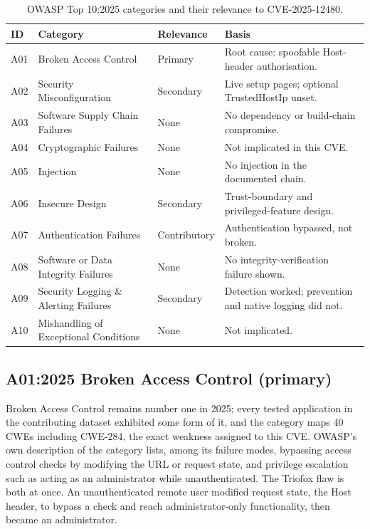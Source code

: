 \documentclass[11pt,a4paper]{article}
\newcommand{\code}[1]{{\small\ttfamily #1}}
\begin{document}
\begin{table}[htbp]
\centering
\caption{OWASP Top 10:2025 categories and their relevance to CVE-2025-12480.}
\label{tab:owasp}
\small
\begin{tabularx}{\textwidth}{p{} p{} p{} X}
\toprule
\rowcolor{headergrey}\textbf{ID} & \textbf{Category} & \textbf{Relevance} & \textbf{Basis} \\
\midrule
A01 & Broken Access Control & Primary & Root cause: spoofable \code{Host}-header authorisation. \\
A02 & Security Misconfiguration & Secondary & Live setup pages; optional \code{TrustedHostIp} unset. \\
A03 & Software Supply Chain Failures & None & No dependency or build-chain compromise. \\
A04 & Cryptographic Failures & None & Not implicated in this CVE. \\
A05 & Injection & None & No injection in the documented chain. \\
A06 & Insecure Design & Secondary & Trust-boundary and privileged-feature design. \\
A07 & Authentication Failures & Contributory & Authentication bypassed, not broken. \\
A08 & Software or Data Integrity Failures & None & No integrity-verification failure shown. \\
A09 & Security Logging \& Alerting Failures & Secondary & Detection worked; prevention and native logging did not. \\
A10 & Mishandling of Exceptional Conditions & None & Not implicated. \\
\bottomrule
\end{tabularx}
\end{table}

\subsection{A01:2025 Broken Access Control (primary)}

Broken Access Control remains number one in 2025; every tested application in the contributing dataset exhibited some form of it, and the category maps 40 CWEs including CWE-284, the exact weakness assigned to this CVE. OWASP's own description of the category lists, among its failure modes, bypassing access control checks by modifying the URL or request state, and privilege escalation such as acting as an administrator while unauthenticated. The Triofox flaw is both at once. An unauthenticated remote user modified request state, the \code{Host} header, to bypass a check and reach administrator-only functionality, then became an administrator.
\end{document}
